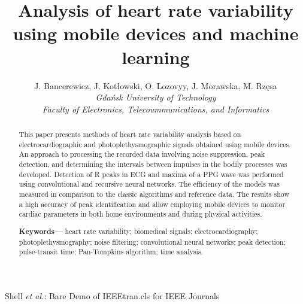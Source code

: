\documentclass[journal]{IEEEtran}
\begin{document}
\title{Analysis of heart rate variability using mobile devices and machine learning}
\author{
    J. Bancerewicz, J. Kotłowski, O. Lozovyy, J. Morawska, M. Rzęsa\\
    \textit{Gdańsk University of Technology}\\
    \textit{Faculty of Electronics, Telecoummunications, and Informatics}
}


\markboth{}%
{Shell \MakeLowercase{\textit{et al.}}: Bare Demo of IEEEtran.cls for IEEE Journals}
\maketitle

\begin{abstract}
This paper presents methods of heart rate variability analysis based on electrocardiographic and photoplethysmographic signals obtained using mobile devices. An approach to processing the recorded data involving noise suppression, peak detection, and determining the intervals between impulses in the bodily processes was developed. Detection of R peaks in ECG and maxima of a PPG wave was performed using convolutional and recursive neural networks. The efficiency of the models was measured in comparison to the classic algorithms and reference data. The results show a high accuracy of peak identification and allow employing mobile devices to monitor cardiac parameters in both home environments and during physical activities.


\textbf{Keywords---} heart rate variability; biomedical signals; electrocardiography; photoplethysmography; noise filtering; convolutional neural networks; peak detection; pulse-transit time; Pan-Tompkins algorithm; time analysis.
\end{abstract}
\end{document}
